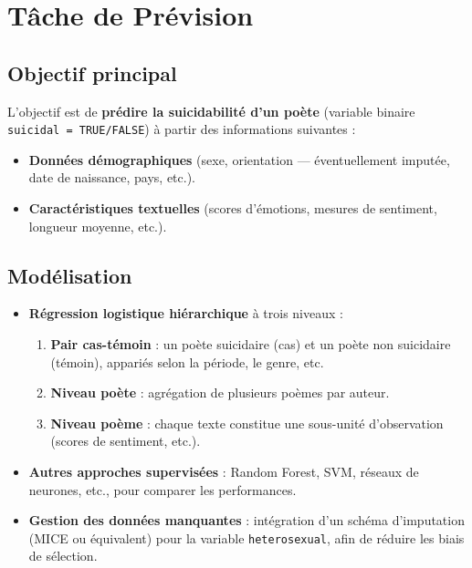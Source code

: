 \documentclass[12pt,a4paper]{article}
\begin{document}
	\section{Tâche de Prévision}
	\label{sec:forecast_task}
	
	\subsection{Objectif principal}
	L’objectif est de \textbf{prédire la suicidabilité d’un poète} (variable binaire 
	\texttt{suicidal = TRUE/FALSE}) à partir des informations suivantes :
	\begin{itemize}
		\item \textbf{Données démographiques} (sexe, orientation — éventuellement imputée, 
		date de naissance, pays, etc.).
		\item \textbf{Caractéristiques textuelles} (scores d’émotions, mesures de sentiment, 
		longueur moyenne, etc.).
	\end{itemize}
	
	\subsection{Modélisation}
	\begin{itemize}
		\item \textbf{Régression logistique hiérarchique} à trois niveaux : 
		\begin{enumerate}
			\item \textbf{Pair cas-témoin} : un poète suicidaire (cas) et 
			un poète non suicidaire (témoin), appariés selon la période, 
			le genre, etc.
			\item \textbf{Niveau poète} : agrégation de plusieurs poèmes par auteur.
			\item \textbf{Niveau poème} : chaque texte constitue une sous-unité 
			d’observation (scores de sentiment, etc.).
		\end{enumerate}
		\item \textbf{Autres approches supervisées} : Random Forest, SVM, réseaux de neurones, etc., 
		pour comparer les performances.
		\item \textbf{Gestion des données manquantes} : intégration d’un schéma 
		d’imputation (MICE ou équivalent) pour la variable \texttt{heterosexual}, 
		afin de réduire les biais de sélection.
	\end{itemize}
	
\end{document}
